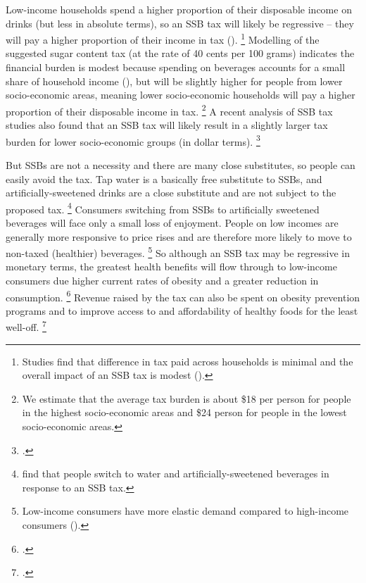 \documentclass[embargoed]{grattan}
\begin{document}
Low-income households spend a higher proportion of their disposable income on drinks (but less in absolute terms), so an SSB tax will likely be regressive -- they will pay a higher proportion of their income in tax ().%
\footnote{Studies find that difference in tax paid across households is minimal and the overall impact of an SSB tax is modest (\textcites{Backholer2014effectsugarsweetened}{Etile2015DoHighConsumers}).} Modelling of the suggested sugar content tax (at the rate of 40 cents per 100 grams) indicates the financial burden is modest because spending on beverages accounts for a small share of household income (), but will be slightly higher for people from lower socio-economic areas, meaning lower socio-economic households will pay a higher proportion of their disposable income in tax.%
\footnote{We estimate that the average tax burden is about \$18 per person for people in the highest socio-economic areas and \$24 person for people in the lowest socio-economic areas.} A recent analysis of SSB tax studies also found that an SSB tax will likely result in a slightly larger tax burden for lower socio-economic groups (in dollar terms).%
\footcite{Backholer2016impacttaxsugar}

But SSBs are not a necessity and there are many close substitutes, so people can easily avoid the tax.
Tap water is a basically free substitute to SSBs, and artificially-sweetened drinks are a close substitute and are not subject to the proposed tax.%
\footnote{\textcites{Briggs2013Overallincomespecific}{Colchero2016Beveragepurchasesstores}{Sharma2014effectstaxingsugarsweetened}{Zhen2014Predictingeffectssugar} find that people switch to water and artificially-sweetened beverages in response to an SSB tax.}
Consumers switching from SSBs to artificially sweetened beverages will face only a small loss of enjoyment.
People on low incomes are generally more responsive to price rises and are therefore more likely to move to non-taxed (healthier) beverages.%
\footnote{Low-income consumers have more elastic demand compared to high-income consumers (\textcites{Yang2016child}{Colchero2016Beveragepurchasesstores}{Etile2015DoHighConsumers}{Briggs2013Overallincomespecific}).} So although an SSB tax may be regressive in monetary terms, the greatest health benefits will flow through to low-income consumers due higher current rates of obesity and a greater reduction in consumption.%
\footcites{Coalition2016Policybriefcase}{Organization2016FiscalPoliciesDiet}{Backholer2016impacttaxsugar} Revenue raised by the tax can also be spent on obesity prevention programs and to improve access to and affordability of healthy foods for the least well-off.%
\footcites{Wetter2016TaxingSugarSweetened}{Organization2016FiscalPoliciesDiet}
\end{document}
